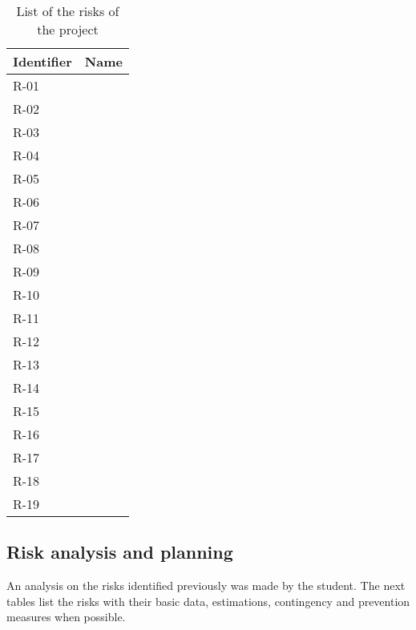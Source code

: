 \begin{table}[H]
	\begin{tabularx}{\textwidth}{|l|X|}
		\hline
		\rowcolor{gray!30}
		Identifier & Name \\ \hline
		R-01 & \Runo \\ \hline
		R-02 & \Rdos \\ \hline
		R-03 & \Rtres \\ \hline
		R-04 & \Rcuatro \\ \hline
		R-05 & \Rcinco \\ \hline
		R-06 & \Rseis \\ \hline
		R-07 & \Rsiete \\ \hline
		R-08 & \Rocho \\ \hline
		R-09 & \Rnueve \\ \hline
		R-10 & \Rdiez \\ \hline
		R-11 & \Ronce \\ \hline
		R-12 & \Rdoce \\ \hline
		R-13 & \Rtrece \\ \hline
		R-14 & \Rcatorce \\ \hline
		R-15 & \Rquince \\ \hline
		R-16 & \Rdieciseis \\ \hline
		R-17 & \Rdiecisiete \\ \hline
		R-18 & \Rdieciocho \\ \hline
		R-19 & \Rdiecinueve \\ \hline
	\end{tabularx}
	\caption{List of the risks of the project}
\end{table}

\subsection{Risk analysis and planning}
An analysis on the risks identified previously was made by the student. The next tables list the risks with their basic data, estimations, contingency and prevention measures when possible.

